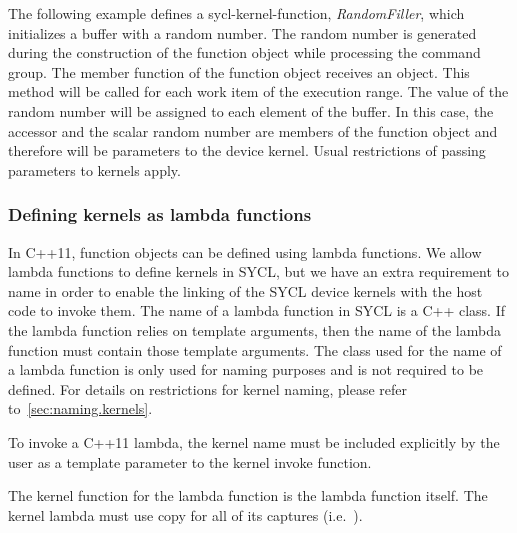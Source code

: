 The following example defines a \gls{sycl-kernel-function}, \textit{RandomFiller},
which initializes a buffer with a random number. 
The random number is generated during the construction of the function 
object while processing the command group.
The  member function of the function object receives an  object.
This method will be called for each work item of the execution range.
The value of the random number will be assigned to each element of the
buffer.
In this case, the accessor and the scalar random number are members of the
function object and therefore will be parameters to the device kernel.
Usual restrictions of passing parameters to kernels apply.



\subsubsection{Defining kernels as lambda functions}
\label{sec:interfaces.kernels.as.lambdas}

In C++11, function objects can be defined using lambda functions. We allow lambda
functions to define kernels in SYCL, but we have an extra requirement to
name  in order to enable the linking of the SYCL
device kernels with the host code to invoke them. The name of a lambda function
in SYCL is a C++ class. If the lambda function relies on template arguments,
then the name of the lambda function must contain those template arguments. The
class used for the name of a lambda function is only used for naming purposes
and is not required to be defined. For details on restrictions for kernel
naming, please refer to~\ref{sec:naming.kernels}.

To invoke a C++11 lambda, the kernel name must be included explicitly by the
user as a template parameter to the kernel invoke function.

The kernel function for the lambda function is the lambda function itself.
The kernel lambda must use copy for all of its captures (i.e.\ \tf{[=]}).


